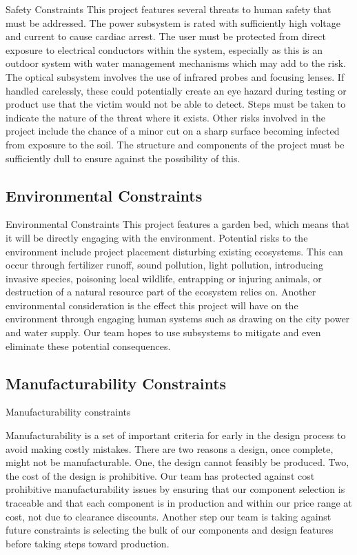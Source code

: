 Safety Constraints
This project features several threats to human safety that must be addressed. 
The power subsystem is rated with sufficiently high voltage and current to cause cardiac arrest. The user must be protected from direct exposure to electrical conductors within the system, especially as this is an outdoor system with water management mechanisms which may add to the risk. 
The optical subsystem involves the use of infrared probes and focusing lenses. If handled carelessly, these could potentially create an eye hazard during testing or product use that the victim would not be able to detect. Steps must be taken to indicate the nature of the threat where it exists. 
Other risks involved in the project include the chance of a minor cut on a sharp surface becoming infected from exposure to the soil. The structure and components of the project must be sufficiently dull to ensure against the possibility of this. 

\subsection{Environmental Constraints}

Environmental Constraints
This project features a garden bed, which means that it will be directly engaging with the environment. Potential risks to the environment include project placement disturbing existing ecosystems. This can occur through fertilizer runoff, sound pollution, light pollution, introducing invasive species, poisoning local wildlife, entrapping or injuring animals, or destruction of a natural resource part of the ecosystem relies on.
Another environmental consideration is the effect this project will have on the environment through engaging human systems such as drawing on the city power and water supply. Our team hopes to use subsystems to mitigate and even eliminate these potential consequences.


\subsection{Manufacturability Constraints}

Manufacturability constraints

Manufacturability is a set of important criteria for early in the design process to avoid making costly mistakes. There are two reasons a design, once complete, might not be manufacturable. One, the design cannot feasibly be produced. Two, the cost of the design is prohibitive. 
Our team has protected against cost prohibitive manufacturability issues by ensuring that our component selection is traceable and that each component is in production and within our price range at cost, not due to clearance discounts. Another step our team is taking against future constraints is selecting the bulk of our components and design features before taking steps toward production.  

